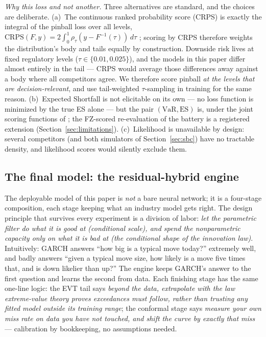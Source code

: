 \documentclass[11pt]{article}
\newcommand{\VaR}{\mathrm{VaR}}
\newcommand{\ES}{\mathrm{ES}}
\theoremstyle{remark}
\begin{document}
\emph{Why this loss and not another.} Three alternatives are standard,
and the choices are deliberate. (a)~The continuous ranked probability
score (CRPS) is exactly the integral of the pinball loss over all
levels, $\mathrm{CRPS}(F,y) = 2\int_0^1 \rho_\tau(y - F^{-1}(\tau))\,
d\tau$ \citep{gneitingraftery2007}; scoring by CRPS therefore weights
the distribution's body and tails equally by construction. Downside
risk lives at fixed regulatory levels ($\tau \in \{0.01, 0.025\}$), and
the models in this paper differ almost entirely in the tail --- CRPS
would average those differences away against a body where all
competitors agree. We therefore score pinball \emph{at the levels that
are decision-relevant}, and use tail-weighted $\tau$-sampling in
training for the same reason. (b)~Expected Shortfall is not elicitable
on its own --- no loss function is minimized by the true ES alone ---
but the pair $(\VaR,\ES)$ is, under the joint scoring functions of
\citet{fissler2016}; the FZ-scored re-evaluation of the battery is a
registered extension (Section~\ref{sec:limitations}). (c)~Likelihood is
unavailable by design: several competitors (and both simulators of
Section~\ref{sec:sbc}) have no tractable density, and likelihood scores
would silently exclude them.

\subsection{The final model: the residual-hybrid engine}\label{sec:hybrid}

The deployable model of this paper is \emph{not} a bare neural network;
it is a four-stage composition, each stage keeping what an industry
model gets right. The design principle that survives every experiment is
a division of labor: \emph{let the parametric filter do what it is good
at (conditional scale), and spend the nonparametric capacity only on
what it is bad at (the conditional shape of the innovation law)}.
Intuitively: GARCH answers ``how big is a typical move today?''
extremely well, and badly answers ``given a typical move size, how
likely is a move five times that, and is down likelier than up?'' The
engine keeps GARCH's answer to the first question and learns the second
from data. Each finishing stage has the same one-line logic: the EVT
tail says \emph{beyond the data, extrapolate with the law extreme-value
theory proves exceedances must follow, rather than trusting any fitted
model outside its training range}; the conformal stage says
\emph{measure your own miss rate on data you have not touched, and
shift the curve by exactly that miss} --- calibration by bookkeeping,
no assumptions needed.
\end{document}
